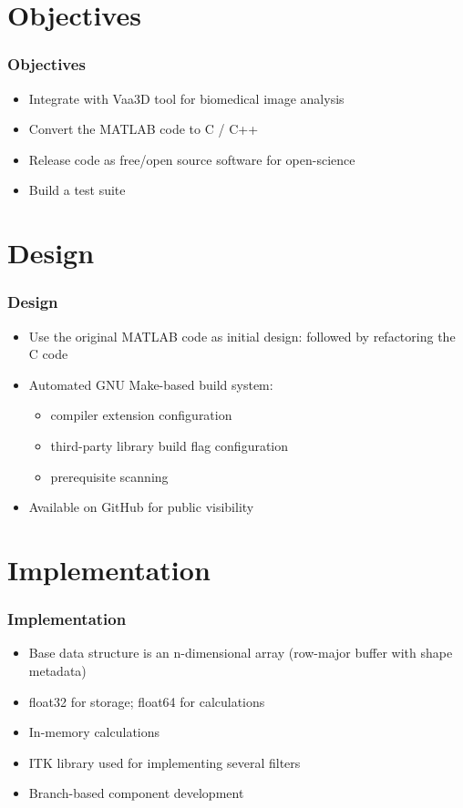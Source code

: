\documentclass[%
        hyperref={%
                pdfauthor={Zakariyya Mughal},%
                pdfpagemode={None},pdfpagelayout={SinglePage}}%
        xcolor={x11names},%
]{beamer}
\begin{document}
\section{Objectives}
\begin{frame}
\frametitle{Objectives}
\begin{itemize}
	\item Integrate with Vaa3D tool for biomedical image analysis
	\item Convert the MATLAB code to C / C++
	\item Release code as free/open source software for open-science
	\item Build a test suite
\end{itemize}
\end{frame}

\section{Design}
\begin{frame}
\frametitle{Design}
\begin{itemize}
	\item Use the original MATLAB code as initial design: followed by refactoring the C code
	\item Automated GNU Make-based build system:
		\begin{itemize}
			\item compiler extension configuration
			\item third-party library build flag configuration
			\item prerequisite scanning
		\end{itemize}
	\item Available on GitHub for public visibility
\end{itemize}
\end{frame}

\section{Implementation}
\begin{frame}
\frametitle{Implementation}
\begin{itemize}
	\item Base data structure is an n-dimensional array (row-major buffer with shape metadata)
	\item float32 for storage; float64 for calculations
	\item In-memory calculations
	\item ITK library used for implementing several filters
	\item Branch-based component development
\end{itemize}
\end{frame}
\end{document}
